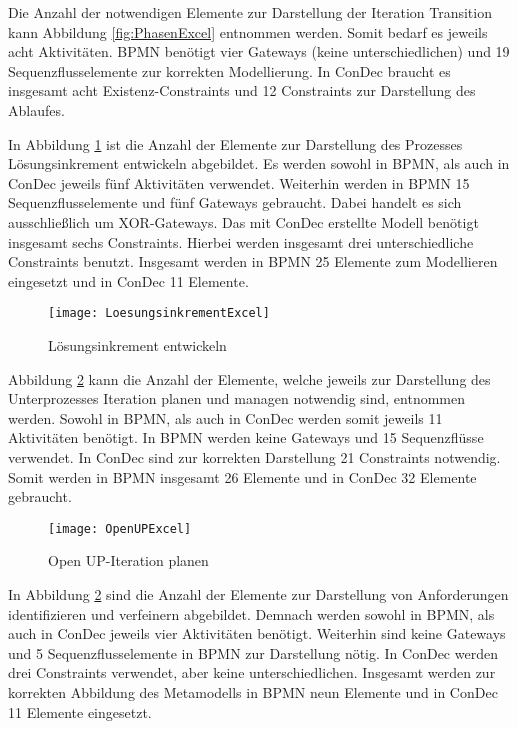Die Anzahl der notwendigen Elemente zur Darstellung der Iteration Transition kann Abbildung \ref{fig:PhasenExcel} entnommen werden. Somit bedarf es jeweils acht Aktivitäten. BPMN benötigt vier Gateways (keine unterschiedlichen) und 19 Sequenzflusselemente zur korrekten Modellierung. In ConDec braucht es insgesamt acht Existenz-Constraints und 12 Constraints zur Darstellung des Ablaufes.\newline


In Abbildung \ref{fig:LoesungsinkrementExcel} ist die Anzahl der Elemente zur Darstellung des Prozesses Lösungsinkrement entwickeln abgebildet. Es werden sowohl in BPMN, als auch in ConDec jeweils fünf Aktivitäten verwendet. Weiterhin werden in BPMN 15 Sequenzflusselemente und fünf Gateways gebraucht. Dabei handelt es sich ausschließlich um XOR-Gateways. Das mit ConDec erstellte Modell benötigt insgesamt sechs Constraints. Hierbei werden insgesamt drei unterschiedliche Constraints benutzt. Insgesamt werden in BPMN 25 Elemente zum Modellieren eingesetzt und in ConDec 11 Elemente.\newline

\begin{figure}[htp]
\begin{center}
  \texttt{[image: LoesungsinkrementExcel]} %
  \caption{Lösungsinkrement entwickeln}
  \label{fig:LoesungsinkrementExcel}
\end{center}
\end{figure}


Abbildung \ref{fig:OpenUPExcel} kann die Anzahl der Elemente, welche jeweils zur Darstellung des Unterprozesses Iteration planen und managen notwendig sind, entnommen werden. Sowohl in BPMN, als auch in ConDec werden somit jeweils 11 Aktivitäten benötigt. In BPMN werden keine Gateways und 15 Sequenzflüsse verwendet. In ConDec sind zur korrekten Darstellung 21 Constraints notwendig. Somit werden in BPMN insgesamt 26 Elemente und in ConDec 32 Elemente gebraucht.\newline

\begin{figure}[htp]
\begin{center}
  \texttt{[image: OpenUPExcel]} %
  \caption{Open UP-Iteration planen}
  \label{fig:OpenUPExcel}
\end{center}
\end{figure}

In Abbildung \ref{fig:OpenUPExcel} sind die Anzahl der Elemente zur Darstellung von Anforderungen identifizieren und verfeinern abgebildet. Demnach werden sowohl in BPMN, als auch in ConDec jeweils vier Aktivitäten benötigt. Weiterhin sind keine Gateways und 5 Sequenzflusselemente in BPMN zur Darstellung nötig. In ConDec werden drei Constraints verwendet, aber keine unterschiedlichen. Insgesamt werden zur korrekten Abbildung des Metamodells in BPMN neun Elemente und in ConDec 11 Elemente eingesetzt.\newline


